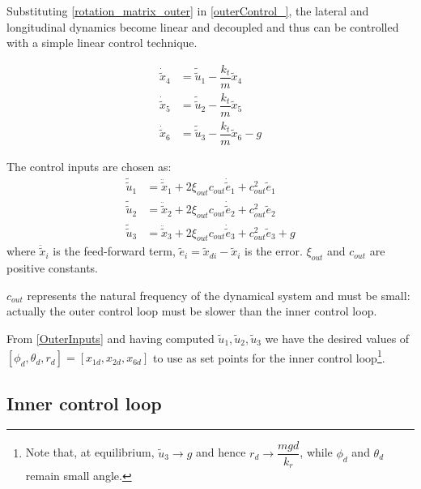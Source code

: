 \documentclass[11pt,a4paper]{scrartcl}
\begin{document}
Substituting \eqref{rotation_matrix_outer} in \eqref{outerControl_}, the lateral and longitudinal dynamics become linear and decoupled and thus can be controlled with a simple linear control technique.

\begin{subequations}
	\begin{align}
		\dot{\tilde{x}}_4 & = \tilde{\tilde{u}}_1 - \dfrac{k_t}{m} \tilde{x}_4 \\
		\dot{\tilde{x}}_5 & = \tilde{\tilde{u}}_2 - \dfrac{k_t}{m} \tilde{x}_5 \\
		\dot{\tilde{x}}_6 & = \tilde{\tilde{u}}_3 - \dfrac{k_t}{m} \tilde{x}_6 - g
	\end{align}
\end{subequations}

The control inputs are chosen as:
\begin{subequations}
	\begin{align}
		\tilde{\tilde{u}}_1 &= \ddot{\tilde{x}}_1 + 2\xi_{out}c_{out} \dot{\tilde{e}}_1 + c_{out}^2 \tilde{e}_1 \\
		\tilde{\tilde{u}}_2 &= \ddot{\tilde{x}}_2 + 2\xi_{out}c_{out} \dot{\tilde{e}}_2 + c_{out}^2 \tilde{e}_2 \\
		\tilde{\tilde{u}}_3 &= \ddot{\tilde{x}}_3 + 2\xi_{out}c_{out} \dot{\tilde{e}}_3 + c_{out}^2 \tilde{e}_3 + g 
	\end{align}
\end{subequations}
where $ \ddot{\tilde{x}}_i $ is the feed-forward term, $ \tilde{e}_i = \tilde{x}_{di} - \tilde{x}_i $ is the error. $ \xi_{out} $ and $ c_{out} $ are positive constants. 

$ c_{out} $ represents the natural frequency of the dynamical system and must be small: actually the outer control loop must be slower than the inner control loop. 

From \eqref{OuterInputs} and having computed $ \tilde{u}_1, \tilde{u}_2, \tilde{u}_3 $ we have the desired values of $ [\phi_d, \theta_d, r_d]=[x_{1d}, x_{2d}, x_{6d}] $ to use as set points for the inner control loop\footnote{Note that, at equilibrium, $ \tilde{u}_3 \rightarrow g $ and hence $ r_d \rightarrow \dfrac{mgd}{k_r} $, while $ \phi_d $ and $ \theta_d $ remain small angle.}. 


\subsection{Inner control loop}
\end{document}
